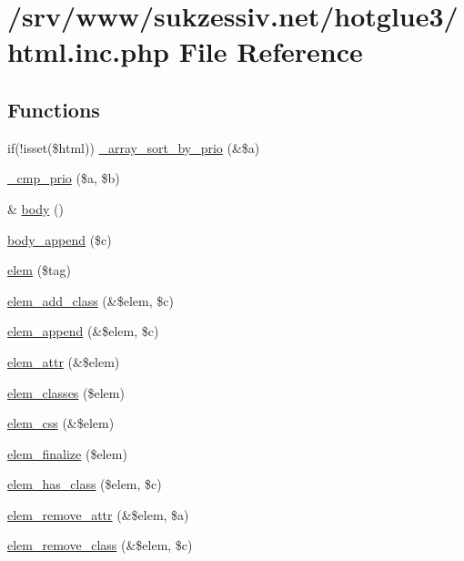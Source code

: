 \hypertarget{html_8inc_8php}{
\section{/srv/www/sukzessiv.net/hotglue3/html.inc.php File Reference}
\label{html_8inc_8php}
}
\subsection*{Functions}
\begin{CompactItemize}
\item 
if(!isset(\$html)) \hyperlink{html_8inc_8php_7fb2b386b2bae219112628971275c225}{\_\-array\_\-sort\_\-by\_\-prio} (\&\$a)
\item 
\hyperlink{html_8inc_8php_f8ecadff0a4b78867d4da5eae49615e1}{\_\-cmp\_\-prio} (\$a, \$b)
\item 
\& \hyperlink{html_8inc_8php_8b842636055e9a5853a7a10a9e002330}{body} ()
\item 
\hyperlink{html_8inc_8php_d27881abf3a2004d287434d8c8d7cdf6}{body\_\-append} (\$c)
\item 
\hyperlink{html_8inc_8php_a7a1256f84f937f1656195d5ce7b8d91}{elem} (\$tag)
\item 
\hyperlink{html_8inc_8php_afa12d2b690751666e599fb052e19ca6}{elem\_\-add\_\-class} (\&\$elem, \$c)
\item 
\hyperlink{html_8inc_8php_ea37c451f5d55e2efbb2656e340c1dae}{elem\_\-append} (\&\$elem, \$c)
\item 
\hyperlink{html_8inc_8php_894dc22f3b7668c59364599909162b8e}{elem\_\-attr} (\&\$elem)
\item 
\hyperlink{html_8inc_8php_821651b8923938645b0b0fa6bb084522}{elem\_\-classes} (\$elem)
\item 
\hyperlink{html_8inc_8php_c705ef06deb9e2d49e342ed78ecc1c9a}{elem\_\-css} (\&\$elem)
\item 
\hyperlink{html_8inc_8php_f04b43a4dd09e73ca2cef84a4f2e9381}{elem\_\-finalize} (\$elem)
\item 
\hyperlink{html_8inc_8php_b1019c4b75181c1c1af10e1c1e5e197d}{elem\_\-has\_\-class} (\$elem, \$c)
\item 
\hyperlink{html_8inc_8php_eb7074172d9164f69e64967b6bcdc643}{elem\_\-remove\_\-attr} (\&\$elem, \$a)
\item 
\hyperlink{html_8inc_8php_6a224914e8f32176ca11a31154b1ae13}{elem\_\-remove\_\-class} (\&\$elem, \$c)
\item 

\end{CompactItemize}
